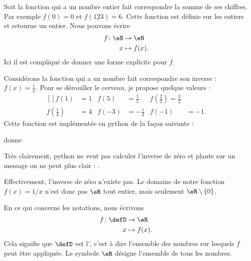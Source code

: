 \begin{example}
    Soit la fonction qui a un nombre entier fait correspondre la somme de ses chiffres. Par exemple \( f(0)=0\) et \( f(123)=6\). Cette fonction est définie sur les entiers et retourne un entier. Nous pouvons écrire
    \begin{equation}
        \begin{aligned}
            f\colon \eN&\to \eN \\
            x&\mapsto f(x). 
        \end{aligned}
    \end{equation}
    Ici il est compliqué de donner une forme explicite pour \( f\).
\end{example}

\begin{example}
    Considérons la fonction qui a un nombre fait correspondre son inverse : \( f(x)=\frac{1}{ x }\). Pour se dérouiller le cerveau, je propose quelque valeurs :
    \begin{equation}
        \begin{aligned}[]
            f(1)&=1&f(5)&=\frac{1}{ 5 }&f(\frac{ 2 }{ 3 })=\frac{ 3 }{ 2 }\\
            f(\frac{ 1 }{ 4 })&=4&f(-3)&=-\frac{1}{ 3 }&f(-1)&=-1.
        \end{aligned}
    \end{equation}
    Cette fonction est implémentée en python de la façon suivante :



donne



Très clairement, python ne veut pas calculer l'inverse de zéro et plante sur un message on ne peut plus clair : .

Effectivement, l'inverse de zéro n'existe pas. Le domaine de notre fonction \( f(x)=1/x\) n'est donc pas \( \eR\) tout entier, mais seulement \( \eR\setminus\{ 0 \}\).

\end{example}


En ce qui concerne les notations, nous écrivons
\begin{equation}
    \begin{aligned}
        f\colon \defD&\to \eR \\
        x&\mapsto f(x). 
    \end{aligned}
\end{equation}
Cela signifie que \( \defD\) est l', c'est à dire l'ensemble des nombres sur lesquels \( f\) peut être appliquée. Le symbole \( \eR\) désigne l'ensemble de tous les nombres.

